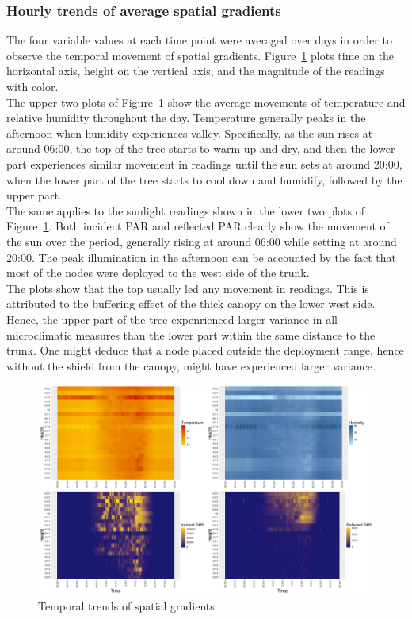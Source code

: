 \documentclass[11pt]{article}
\begin{document}
\subsubsection{Hourly trends of average spatial gradients}
\label{subsubsec:tempSpatial}
The four variable values at each time point were averaged over days in order to observe the temporal movement of spatial gradients. Figure~\ref{fig:avgTemporal} plots time on the horizontal axis, height on the vertical axis, and the magnitude of the readings with color.\\
The upper two plots of Figure~\ref{fig:avgTemporal} show the average movements of temperature and relative humidity throughout the day. Temperature generally peaks in the afternoon when humidity experiences valley. Specifically, as the sun rises at around 06:00, the top of the tree starts to warm up and dry, and then the lower part experiences similar movement in readings until the sun sets at around 20:00, when the lower part of the tree starts to cool down and humidify, followed by the upper part. \\
The same applies to the sunlight readings shown in the lower two plots of Figure~\ref{fig:avgTemporal}. Both incident PAR and reflected PAR clearly show the movement of the sun over the period, generally rising at around 06:00 while setting at around 20:00. The peak illumination in the afternoon can be accounted by the fact that most of the nodes were deployed to the west side of the trunk. \\
The plots show that the top usually led any movement in readings. This is attributed to the buffering effect of the thick canopy on the lower west side. Hence, the upper part of the tree expenrienced larger variance in all microclimatic measures than the lower part within the same distance to the trunk. One might deduce that a node placed outside the deployment range, hence without the shield from the canopy, might have experienced larger variance.
\begin{figure}[!h]
  \centering
    \includegraphics[width=.9\textwidth]{../figures/avgTemporal.png}
  \caption{Temporal trends of spatial gradients}
  \label{fig:avgTemporal}
\end{figure}
\end{document}
